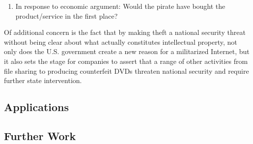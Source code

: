 \documentclass[onecolumn, 12pt]{article}
\begin{document}
\begin{enumerate}
  \item In response to economic argument: Would the pirate have bought the
    product/service in the first place?
\end{enumerate}

\begin{displayquote}
  Of additional concern is the fact that by making 
  theft a national security threat without being clear about what actually
  constitutes intellectual property, not only does the U.S. government create a
  new reason for a militarized Internet, but it also sets the stage for companies
  to assert that a range of other activities from file sharing to producing
  counterfeit DVDs threaten national security and require further state
  intervention.~\cite[p. 264]{halbert:agendas}
\end{displayquote}


\subsection{Applications}

\subsection{Further Work}

\clearpage
\nocite{*}
\printbibliography
\end{document}
